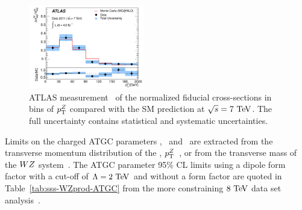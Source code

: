 \begin{figure}[htbp]
  \begin{center}
  \includegraphics[width=0.45\textwidth]{figures/sss-inclboson-diboson-wzprod-ptZ.pdf}
  \caption{ATLAS measurement~\cite{Aad:2012twa} of the normalized fiducial cross-sections in bins of $p_{\mathrm{T}}^Z$ compared with the SM prediction at $\rts = 7\TeV$. The full uncertainty contains statistical and systematic uncertainties.}
\label{fig:sss-WZprod-ptZ-det}
\end{center}
\end{figure}


Limits on the charged ATGC parameters \dkz, \lz\ and \gz\ are extracted from the transverse momentum distribution
of the \Zboson, $p_{\mathrm{T}}^Z$~\cite{Aad:2012twa}, or from the transverse mass of the $WZ$ system~\cite{Aad:2016ett}. 
The ATGC parameter 95\% CL limits using a dipole form factor with a cut-off of $\Lambda=2\TeV$ and without a form factor are quoted 
in Table~\ref{tab:sss-WZprod-ATGC} from the more constraining $8\TeV$ data set analysis~\cite{Aad:2016ett}.



